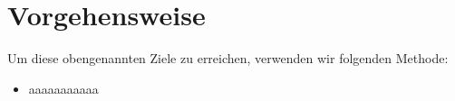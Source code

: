 \section{Vorgehensweise}

Um diese obengenannten Ziele zu erreichen, verwenden wir folgenden Methode:

\begin{itemize}[noitemsep]
   \item aaaaaaaaaaa
\end{itemize}








